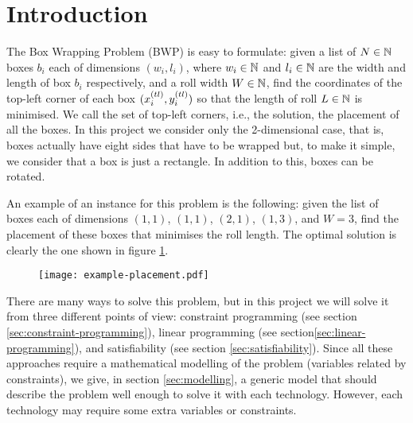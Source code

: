 \section{Introduction}
\label{sec:introduction}

The Box Wrapping Problem (BWP) is easy to formulate: given a list of $N \in \mathbb{N}$ boxes
$b_i$ each of dimensions $(w_i, l_i)$, where $w_i \in \mathbb{N}$ and $l_i \in \mathbb{N}$
are the width and length of box $b_i$ respectively, and a roll width $W \in \mathbb{N}$,
find the coordinates of  the top-left corner of each box $(\Xtl[i], \Ytl[i])$ so that
the length of roll $L \in \mathbb{N}$ is minimised. We call the set of top-left corners, i.e.,
the solution, the placement of all the boxes. In this project we consider only the
2-dimensional case, that is, boxes actually have eight sides that have to be wrapped but,
to make it simple, we consider that a box is just a rectangle. In addition to this, boxes
can be rotated.

\hfill

An example of an instance for this problem is the following: given the list of boxes each
of dimensions $(1,1)$, $(1,1)$, $(2,1)$, $(1,3)$, and $W=3$, find the placement of these
boxes that minimises the roll length. The optimal solution is clearly the one shown
in figure \ref{fig:example-placement}.

\begin{figure}[H]
	\centering
    \texttt{[image: example-placement.pdf]}
	\label{fig:example-placement}
\end{figure}

There are many ways to solve this problem, but in this project we will solve it from
three different points of view: constraint programming (see section \ref{sec:constraint-programming}),
linear programming (see section\ref{sec:linear-programming}), and satisfiability (see
section \ref{sec:satisfiability}). Since all these approaches require a mathematical modelling
of the problem (variables related by constraints), we give, in section \ref{sec:modelling},
a generic model that should describe the problem well enough to solve it with each technology.
However, each technology may require some extra variables or constraints.